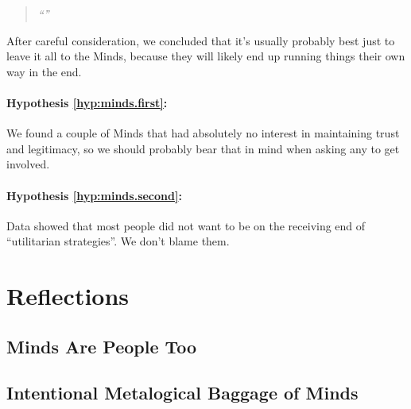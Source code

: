 \begin{quote}
	\textit{``\RQMinds''}
\end{quote}

After careful consideration, we concluded that it's usually probably best just to leave it all to the Minds, because they will likely end up running things their own way in the end.

\paragraph*{Hypothesis \ref{hyp:minds.first}:} \textit{\HMindsA}

We found a couple of Minds that had absolutely no interest in maintaining trust and legitimacy, so we should probably bear that in mind when asking any to get involved.

\paragraph*{Hypothesis \ref{hyp:minds.second}:} \textit{\HMindsB}

Data showed that most people did not want to be on the receiving end of ``utilitarian strategies''.  We don't blame them.


\section{Reflections}
\label{sec:example2.reflections}

\subsection{Minds Are People Too}
\label{subsec:example2.reflections.minds}

\lipsum[6-7]


\subsection{Intentional Metalogical Baggage of Minds}
\label{subsec:example2.reflections.baggage}

\lipsum[4]
